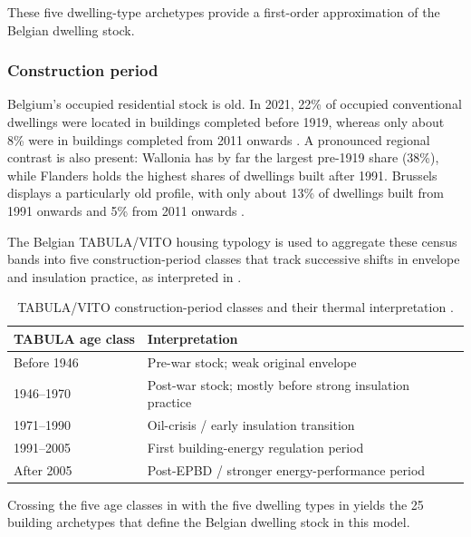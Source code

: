 These five dwelling-type archetypes provide a first-order approximation of the
Belgian dwelling stock.

\subsubsection*{Construction period}
Belgium's occupied residential stock is old. In 2021, 22\% of occupied
conventional dwellings were located in buildings completed before 1919, whereas
only about 8\% were in buildings completed from 2011 onwards
\cite{statbel_census_construction_2021}. A pronounced regional contrast is also
present: Wallonia has by far the largest pre-1919 share (38\%), while Flanders
holds the highest shares of dwellings built after 1991. Brussels displays a
particularly old profile, with only about 13\% of dwellings built from 1991
onwards and 5\% from 2011 onwards \cite{statbel_census_construction_2021}.

The Belgian TABULA/VITO housing typology is used to aggregate these census bands
into five construction-period classes that track successive shifts in envelope
and insulation practice, as interpreted in
.

\begin{table}[ht]
  \centering
  \caption{TABULA/VITO construction-period classes and their thermal
           interpretation \cite{tabula_be_vito}.}
  \label{tab:construction_period_classes}
  \begin{tabular}{ll}
    \toprule
    TABULA age class & Interpretation \\
    \midrule
    Before 1946 & Pre-war stock; weak original envelope \\
    1946--1970  & Post-war stock; mostly before strong insulation practice \\
    1971--1990  & Oil-crisis / early insulation transition \\
    1991--2005  & First building-energy regulation period \\
    After 2005  & Post-EPBD / stronger energy-performance period \\
    \bottomrule
  \end{tabular}
\end{table}

Crossing the five age classes in  with the
five dwelling types in  yields the 25 building
archetypes that define the Belgian dwelling stock in this model.

